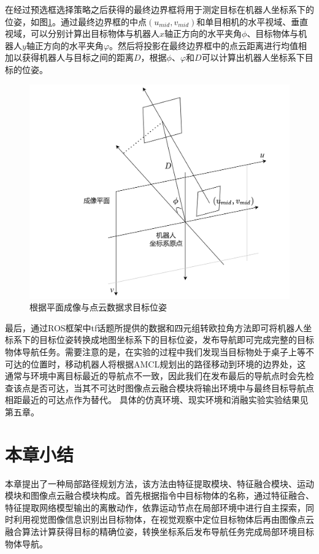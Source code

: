 在经过预选框选择策略之后获得的最终边界框将用于测定目标在机器人坐标系下的位姿，如图\ref{target_pose}。通过最终边界框的中点$\left( {{u_{mid}},{v_{mid}}} \right)$和单目相机的水平视域、垂直视域，可以分别计算出目标物体与机器人$x$轴正方向的水平夹角$\phi $、目标物体与机器人$y$轴正方向的水平夹角$\varphi $。然后将投影在最终边界框中的点云距离进行均值相加以获得机器人与目标之间的距离$D$，根据$\phi $、$\varphi $和$D$可以计算出机器人坐标系下目标的位姿。
\begin{figure}[htbp]
    \centering
    \includegraphics[scale=0.11]{Fig/目标坐标..png}
    \caption{\label{target_pose}根据平面成像与点云数据求目标位姿}
\end{figure}
最后，通过ROS框架中tf话题所提供的数据和四元组转欧拉角方法即可将机器人坐标系下的目标位姿转换成地图坐标系下的目标位姿，发布导航即可完成完整的目标物体导航任务。需要注意的是，在实验的过程中我们发现当目标物处于桌子上等不可达的位置时，移动机器人将根据AMCL规划出的路径移动到环境的边界处，这通常与环境中离目标最近的导航点不一致，因此我们在发布最后的导航点时会先检查该点是否可达，当其不可达时图像点云融合模块将输出环境中与最终目标导航点相距最近的可达点作为替代。
具体的仿真环境、现实环境和消融实验实验结果见第五章。





\section{本章小结}
本章提出了一种局部路径规划方法，该方法由特征提取模块、特征融合模块、运动模块和图像点云融合模块构成。首先根据指令中目标物体的名称，通过特征融合、特征提取网络模型输出的离散动作，依靠运动节点在局部环境中进行自主探索，同时利用视觉图像信息识别出目标物体，在视觉观察中定位目标物体后再由图像点云融合算法计算获得目标的精确位姿，转换坐标系后发布导航任务完成局部环境目标物体导航。
